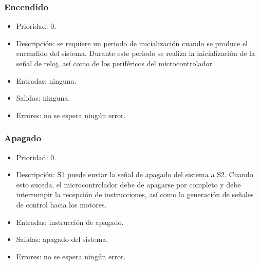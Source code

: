 \subsubsection{Encendido}
\begin{itemize}
    \item Prioridad: 0.
    \item Descripción: se requiere un periodo de inicialización cuando se produce el encendido del sistema. Durante este periodo se realiza la inicialización de la señal de reloj, así como de los periféricos del microcontrolador. 
    \item Entradas: ninguna.
    \item Salidas: ninguna.
    \item Errores: no se espera ningún error.
\end{itemize}

\subsubsection{Apagado}
\begin{itemize}
    \item Prioridad: 0.
    \item Descripción: \ac{S1} puede enviar la señal de apagado del sistema a \ac{S2}. Cuando esto suceda, el microcontrolador debe de apagarse por completo y debe interrumpir la recepción de instrucciones, así como la generación de señales de control hacia los motores.
    \item Entradas: instrucción de apagado.
    \item Salidas: apagado del sistema.
    \item Errores: no se espera ningún error.
\end{itemize}

